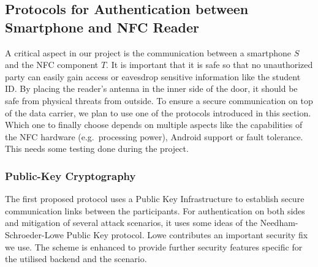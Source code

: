 \subsection{Protocols for Authentication between Smartphone and NFC Reader}
A critical aspect in our project is the communication between a smartphone $ S $ and the NFC component $ T $.
It is important that it is safe so that no unauthorized party can easily gain access or eavesdrop sensitive information like the student ID.
By placing the reader's antenna in the inner side of the door, it should be safe from physical threats from outside.
To ensure a secure communication on top of the data carrier, we plan to use one of the protocols introduced in this section.
Which one to finally choose depends on multiple aspects like the capabilities of the NFC hardware (e.g.~processing power), Android support or fault tolerance. This needs some testing done during the project. 

\subsubsection{Public-Key Cryptography}
The first proposed protocol uses a Public Key Infrastructure to establish secure communication links between the participants.
For authentication on both sides and mitigation of several attack scenarios, it uses some ideas of the Needham-Schroeder-Lowe Public Key protocol. Lowe contributes an important security fix we use.
The scheme is enhanced to provide further security features specific for the utilised backend and the scenario.

